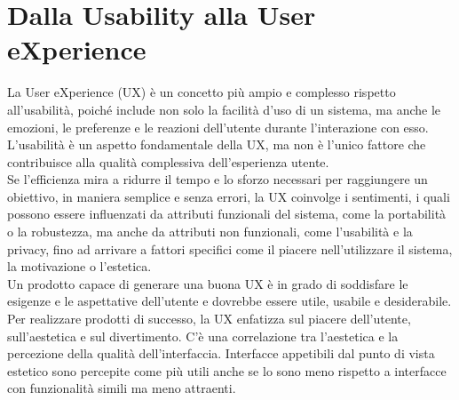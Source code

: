 \documentclass{report}
\begin{document}
	\section{Dalla Usability alla User eXperience}
	La User eXperience (UX) è un concetto più ampio e complesso rispetto all'usabilità, poiché include non solo la facilità d'uso di un sistema, ma anche le emozioni, le preferenze e le reazioni dell'utente durante l'interazione con esso. L'usabilità è un aspetto fondamentale della UX, ma non è l'unico fattore che contribuisce alla qualità complessiva dell'esperienza utente.
	\vspace{\baselineskip} \\
	Se l'efficienza mira a ridurre il tempo e lo sforzo necessari per raggiungere un obiettivo, in maniera semplice e senza errori, la UX coinvolge i sentimenti, i quali possono essere influenzati da attributi funzionali del sistema, come la portabilità o la robustezza, ma anche da attributi non funzionali, come l'usabilità e la privacy, fino ad arrivare a fattori specifici come il piacere nell'utilizzare il sistema, la motivazione o l'estetica.
	\vspace{\baselineskip} \\
	Un prodotto capace di generare una buona UX è in grado di soddisfare le esigenze e le aspettative dell'utente e dovrebbe essere utile, usabile e desiderabile. Per realizzare prodotti di successo, la UX enfatizza sul piacere dell'utente, sull'aestetica e sul divertimento. C'è una correlazione tra l'aestetica e la percezione della qualità dell'interfaccia. Interfacce appetibili dal punto di vista estetico sono percepite come più utili anche se lo sono meno rispetto a interfacce con funzionalità simili ma meno attraenti.
	
\end{document}
